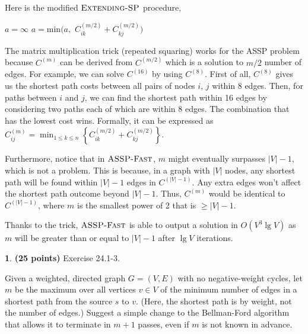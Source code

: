 \documentclass[11pt]{article}
\theoremstyle{definition}
\theoremstyle{theorem}
\newtheorem{prob}{}
\newcommand{\solution}{\medskip\noindent{\color{DarkBlue}\textbf{Solution:}}}
\begin{document}
Here is the modified $\textproc{\textsc{Extending-SP}}$ procedure,
\begin{algorithmic}[1]
			\State $a = \infty$
				\State $a = \text{min}(a,$ $C_{ik}^{(m/2)} + C_{kj}^{(m/2)})$
			\EndFor
		\EndFor
	\EndFor
\EndFunction
\end{algorithmic}

The matrix multiplication trick (repeated squaring) works for the ASSP problem because $C^{(m)}$ can be derived from $C^{(m/2)}$ which is a solution to $m/2$ number of edges. For example, we can solve $C^{(16)}$ by using $C^{(8)}$. First of all, $C^{(8)}$ gives us the shortest path costs between all pairs of nodes $i$, $j$ within 8 edges. Then, for paths between $i$ and $j$, we can find the shortest path within 16 edges by considering two paths each of which are within 8 edges. The combination that has the lowest cost wins. Formally, it can be expressed as $C_{ij}^{(m)} = \min_{1 \le k \le n} \left\{C_{ik}^{(m/2)} + C_{kj}^{(m/2)}\right\}$. 

Furthermore, notice that in $\textproc{\textsc{ASSP-Fast}}$, $m$ might eventually surpasses $|V| - 1$, which is not a problem. This is because, in a graph with $|V|$ nodes, any shortest path will be found within $|V| - 1$ edges in $C^{(|V|-1)}$. Any extra edges won't affect the shortest path outcome beyond $|V| - 1$. Thus, $C^{(m)}$ would be identical to $C^{(|V| - 1)}$, where $m$ is the smallest power of 2 that is $\ge |V| - 1$.

Thanks to the trick, $\textproc{\textsc{ASSP-Fast}}$ is able to output a solution in $O(V^3 \lg{V})$ as $m$ will be greater than or equal to $|V| - 1$ after $\lg{V}$ iterations.


\newpage
\begin{prob} \textbf{(25 points)} Exercise 24.1-3.
\end{prob}

Given a weighted, directed graph $G = (V, E)$ with no negative-weight cycles, let $m$ be the maximum over all vertices $v \in V$ of the minimum number of edges in a shortest path from the source $s$ to $v$. (Here, the shortest path is by weight, not the number of edges.) Suggest a simple change to the Bellman-Ford algorithm that allows it to terminate in $m + 1$ passes, even if $m$ is not known in advance.

\solution
\end{document}
